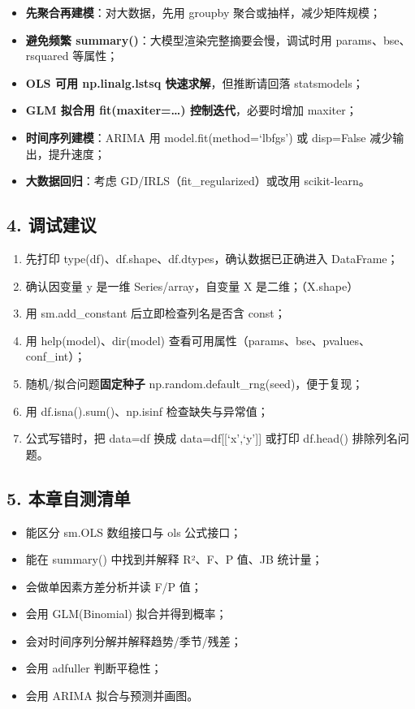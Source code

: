 \begin{itemize}
\tightlist
\item
  \textbf{先聚合再建模}：对大数据，先用 groupby
  聚合或抽样，减少矩阵规模；
\item
  \textbf{避免频繁 summary()}：大模型渲染完整摘要会慢，调试时用
  params、bse、rsquared 等属性；
\item
  \textbf{OLS 可用 np.linalg.lstsq 快速求解}，但推断请回落 statsmodels；
\item
  \textbf{GLM 拟合用 fit(maxiter=\ldots) 控制迭代}，必要时增加 maxiter；
\item
  \textbf{时间序列建模}：ARIMA 用 model.fit(method=`lbfgs') 或
  disp=False 减少输出，提升速度；
\item
  \textbf{大数据回归}：考虑 GD/IRLS（fit\_regularized）或改用
  scikit-learn。
\end{itemize}

\subsection{4. 调试建议}\label{ux8c03ux8bd5ux5efaux8bae-6}

\begin{enumerate}
\def\labelenumi{\arabic{enumi}.}
\tightlist
\item
  先打印 type(df)、df.shape、df.dtypes，确认数据已正确进入 DataFrame；
\item
  确认因变量 y 是一维 Series/array，自变量 X 是二维；（X.shape）
\item
  用 sm.add\_constant 后立即检查列名是否含 const；
\item
  用 help(model)、dir(model)
  查看可用属性（params、bse、pvalues、conf\_int）；
\item
  随机/拟合问题\textbf{固定种子}
  np.random.default\_rng(seed)，便于复现；
\item
  用 df.isna().sum()、np.isinf 检查缺失与异常值；
\item
  公式写错时，把 data=df 换成 data=df{[}{[}`x',`y'{]}{]} 或打印
  df.head() 排除列名问题。
\end{enumerate}

\subsection{5. 本章自测清单}\label{ux672cux7ae0ux81eaux6d4bux6e05ux5355}

\begin{itemize}
\tightlist
\item[$\square$]
  能区分 sm.OLS 数组接口与 ols 公式接口；
\item[$\square$]
  能在 summary() 中找到并解释 R²、F、P 值、JB 统计量；
\item[$\square$]
  会做单因素方差分析并读 F/P 值；
\item[$\square$]
  会用 GLM(Binomial) 拟合并得到概率；
\item[$\square$]
  会对时间序列分解并解释趋势/季节/残差；
\item[$\square$]
  会用 adfuller 判断平稳性；
\item[$\square$]
  会用 ARIMA 拟合与预测并画图。
\end{itemize}

